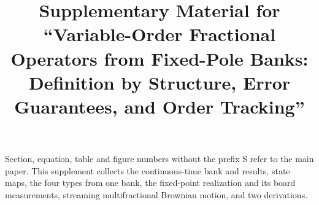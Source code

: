 \documentclass[10pt]{article}
\title{Supplementary Material for ``Variable-Order Fractional Operators from Fixed-Pole Banks: Definition by Structure, Error Guarantees, and Order Tracking''}
\author{}
\date{}
\begin{document}
\maketitle
\noindent Section, equation, table and figure numbers without the prefix S refer to the main paper. This supplement collects the continuous-time bank and results, state maps, the four types from one bank, the fixed-point realization and its board measurements, streaming multifractional Brownian motion, and two derivations.





\end{document}
